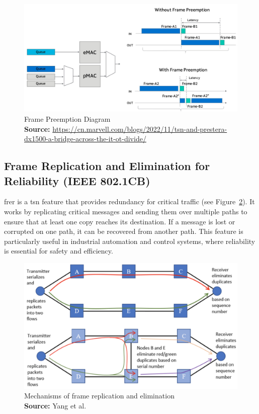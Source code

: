 \documentclass[runningheads]{llncs}
\newcommand*{\captionsource}[2]{%
  \caption[{#1}]{%
    #1%
    \\\hspace{\linewidth}%
    \textbf{Source:} #2%
  }%
}
\begin{document}
\begin{figure}[ht]
  \centering
  \includegraphics[width=\linewidth]{frame_preemption}
  \captionsource{Frame Preemption Diagram}{\url{https://cn.marvell.com/blogs/2022/11/tsn-and-prestera-dx1500-a-bridge-across-the-it-ot-divide/}}
  \label{fig:fpem}
\end{figure}

\subsection*{Frame Replication and Elimination for Reliability (IEEE 802.1CB)}
\gls{frer} is a \gls{tsn} feature that provides redundancy for critical traffic (see Figure~\ref{fig:frer}). It works by replicating critical messages and sending them over multiple paths to ensure that at least one copy reaches its destination. If a message is lost or corrupted on one path, it can be recovered from another path. This feature is particularly useful in industrial automation and control systems, where reliability is essential for safety and efficiency.

\begin{figure}[ht]
  \centering
  \includegraphics[width=0.8\linewidth]{frer}
  \captionsource{Mechanisms of frame replication and elimination}{Yang et al.~\cite{Yang2019}}
  \label{fig:frer}
\end{figure}
\end{document}
